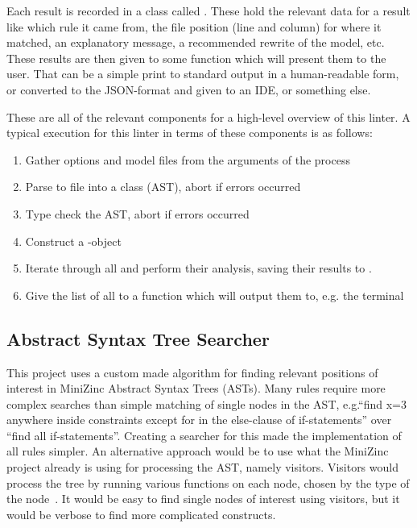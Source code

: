 \documentclass[a4paper,12pt]{article}
\begin{document}
Each result is recorded in a class called . These hold the relevant data
for a result like which rule it came from, the file position (line and column) for where it
matched, an explanatory message, a recommended rewrite of the model, etc. These results are
then given to some function which will present them to the user. That can be a simple
print to standard output in a human-readable form, or converted to the JSON-format and
given to an IDE, or something else.

These are all of the relevant components for a high-level overview of this linter. A
typical execution for this linter in terms of these components is as follows:
\begin{enumerate}
  \item Gather options and model files from the arguments of the process
  \item Parse to file into a  class (AST), abort if errors occurred
  \item Type check the AST, abort if errors occurred
  \item Construct a -object
  \item Iterate through all  and perform their analysis, saving their
  results to .
  \item Give the list of all  to a function which will output them to, e.g.\@
  the terminal
\end{enumerate}

\subsection{Abstract Syntax Tree Searcher}\label{sec:searcher}
This project uses a custom made algorithm for finding relevant positions of interest in
MiniZinc Abstract Syntax Trees (ASTs). Many rules require more complex searches than
simple matching of single nodes in the AST, e.g.\@ ``find x=3 anywhere inside constraints
except for in the else-clause of if-statements'' over ``find all if-statements''. Creating
a searcher for this made the implementation of all rules simpler. An alternative
approach would be to use what the MiniZinc project already is using for processing the
AST, namely visitors. Visitors would process the tree by running various functions on each
node, chosen by the type of the node~\cite[p.~331]{DesignPatterns94}. It would be easy to find
single nodes of interest using visitors, but it would be verbose to find
more complicated constructs.
\end{document}
